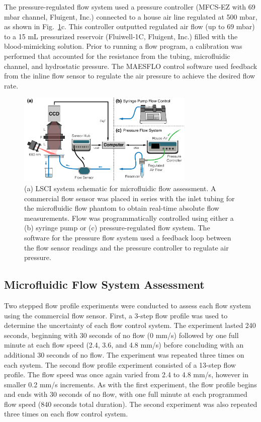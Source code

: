 \documentclass[12pt]{spieman}
\begin{document}
\begin{spacing}{2}
The pressure-regulated flow system used a pressure controller (MFCS-EZ with 69 mbar channel, Fluigent, Inc.) connected to a house air line regulated at 500 mbar, as shown in Fig.~\ref{fig:system_lsci}c. This controller outputted regulated air flow (up to 69 mbar) to a 15 mL pressurized reservoir (Fluiwell-1C, Fluigent, Inc.) filled with the blood-mimicking solution. Prior to running a flow program, a calibration was performed that accounted for the resistance from the tubing, microfluidic channel, and hydrostatic pressure. The MAESFLO control software used feedback from the inline flow sensor to regulate the air pressure to achieve the desired flow rate.

\begin{figure}
    \centering
    \includegraphics[width=0.75\textwidth]{Figure2.pdf}
    \caption {
        (a) LSCI system schematic for microfluidic flow assessment. A commercial flow sensor was placed in series with the inlet tubing for the microfluidic flow phantom to obtain real-time absolute flow measurements. Flow was programmatically controlled using either a (b) syringe pump or (c) pressure-regulated flow system. The software for the pressure flow system used a feedback loop between the flow sensor readings and the pressure controller to regulate air pressure.
    }
    \label{fig:system_lsci}
\end{figure}


\subsection{Microfluidic Flow System Assessment}
\label{sect:methods_flow_assess}

Two stepped flow profile experiments were conducted to assess each flow system using the commercial flow sensor. First, a 3-step flow profile was used to determine the uncertainty of each flow control system. The experiment lasted 240 seconds, beginning with 30 seconds of no flow (0 mm/s) followed by one full minute at each flow speed (2.4, 3.6, and 4.8 mm/s) before concluding with an additional 30 seconds of no flow. The experiment was repeated three times on each system. The second flow profile experiment consisted of a 13-step flow profile. The flow speed was once again varied from 2.4 to 4.8 mm/s, however in smaller 0.2 mm/s increments. As with the first experiment, the flow profile begins and ends with 30 seconds of no flow, with one full minute at each programmed flow speed (840 seconds total duration). The second experiment was also repeated three times on each flow control system. 


\end{spacing}
\end{document}
